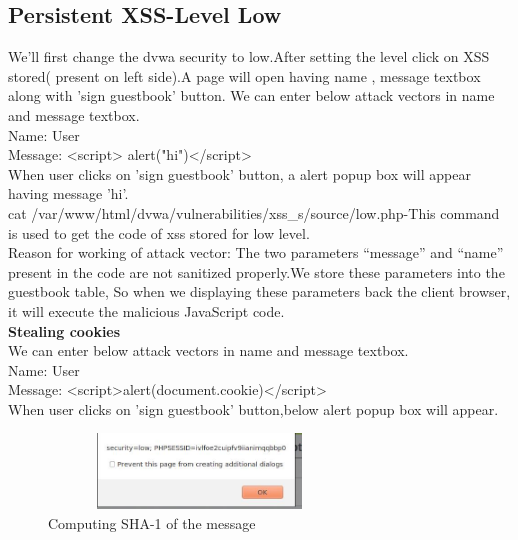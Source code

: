 \documentclass{article}
\begin{document}
\subsection{Persistent XSS-Level Low}
We'll first change the dvwa security to low.After setting the level click on XSS stored( present on left side).A page will open having name , message textbox along with 'sign guestbook' button. We can enter below attack vectors in name and message textbox.\\
Name: User\\
Message: <script> alert("hi")</script>\\
When user clicks on 'sign guestbook' button, a alert popup box will appear having message 'hi'.\\
cat /var/www/html/dvwa/vulnerabilities/xss\_s/source/low.php-This command is used to get the code of xss stored for low level.\\
Reason for working of attack vector: The two parameters “message” and “name” present in the code  are not sanitized properly.We store these
parameters into the guestbook table, So when we displaying these parameters back the client browser,
it will execute the malicious JavaScript code.\\
\textbf{Stealing cookies}\\
 We can enter below attack vectors in name and message textbox.\\
Name: User\\
Message: <script>alert(document.cookie)</script>\\
When user clicks on 'sign guestbook' button,below alert popup box will appear.\\
\begin{figure}[htb]
		\includegraphics[width=8cm,height=2cm]{cookies.jpg}
		\caption{Computing SHA-1 of the message}
	\end{figure}
\end{document}

